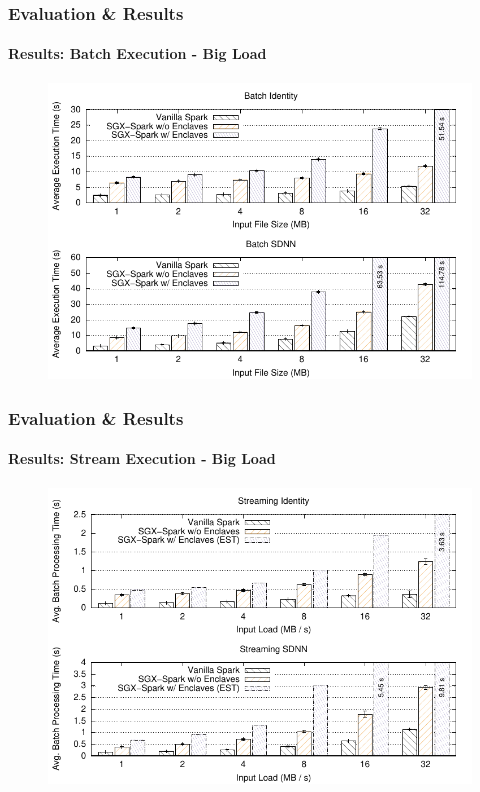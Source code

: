 \documentclass[10pt,    %
    english,            %
    xcolor=table,       %
    envcountsect,        %
    aspectratio=169     %
]{beamer}
\begin{document}
\begin{frame}
    \frametitle{Evaluation \& Results}
    \framesubtitle{Results: Batch Execution - Big Load}

    \vspace{-15pt}

    \begin{figure}[T]
        \centering
        \includegraphics[width=.7\textwidth]{plots/big_input_size.pdf}
    \end{figure}

\end{frame}

%
%
%

\begin{frame}
    \frametitle{Evaluation \& Results}
    \framesubtitle{Results: Stream Execution - Big Load}

    \vspace{-15pt}

    \begin{figure}[T]
        \centering
        \includegraphics[width=.7\textwidth]{plots/big_throughput.pdf}
    \end{figure}

\end{frame}
\end{document}
